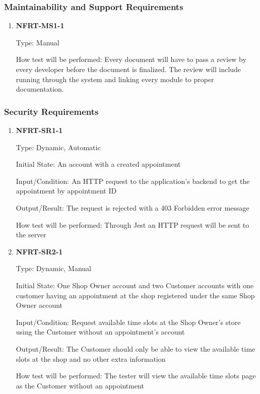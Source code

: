 \documentclass[12pt, titlepage]{article}
\begin{document}
\subsubsection{Maintainability and Support Requirements}
\begin{enumerate}
	\item \textbf{NFRT-MS1-1} %

	      Type: Manual

	      How test will be performed: Every document will have to pass a review by every developer before the
	      document is finalized. The review will include running through the system and linking every module
	      to proper documentation.

\end{enumerate}

\subsubsection{Security Requirements}
\begin{enumerate}

	\item \textbf{NFRT-SR1-1}

	      Type: Dynamic, Automatic

	      Initial State: An account with a created appointment

	      Input/Condition: An HTTP request to the application's backend to get the appointment by appointment
	      ID

	      Output/Result: The request is rejected with a 403 Forbidden error message

	      How test will be performed: Through Jest an HTTP request will be sent to the server

	\item \textbf{NFRT-SR2-1}

	      Type: Dynamic, Manual

	      Initial State: One Shop Owner account and two Customer accounts with one customer having an
	      appointment at the shop registered under the same Shop Owner account

	      Input/Condition: Request available time slots at the Shop Owner's store using the Customer without
	      an appointment's account

	      Output/Result: The Customer should only be able to view the available time slots at the shop and no
	      other extra information

	      How test will be performed: The tester will view the available time slots page as the Customer
	      without an appointment

\end{enumerate}
\end{document}
